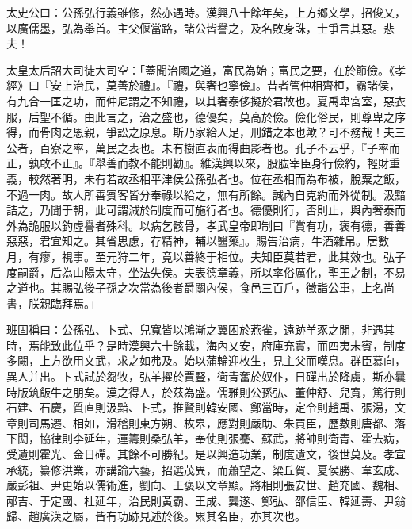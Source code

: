 \begin{pinyinscope}
太史公曰：公孫弘行義雖修，然亦遇時。漢興八十餘年矣，上方鄉文學，招俊乂，以廣儒墨，弘為舉首。主父偃當路，諸公皆譽之，及名敗身誅，士爭言其惡。悲夫！

太皇太后詔大司徒大司空：「蓋聞治國之道，富民為始；富民之要，在於節儉。《孝經》曰『安上治民，莫善於禮』。『禮，與奢也寧儉』。昔者管仲相齊桓，霸諸侯，有九合一匡之功，而仲尼謂之不知禮，以其奢泰侈擬於君故也。夏禹卑宮室，惡衣服，后聖不循。由此言之，治之盛也，德優矣，莫高於儉。儉化俗民，則尊卑之序得，而骨肉之恩親，爭訟之原息。斯乃家給人足，刑錯之本也歟？可不務哉！夫三公者，百寮之率，萬民之表也。未有樹直表而得曲影者也。孔子不云乎，『子率而正，孰敢不正』。『舉善而教不能則勸』。維漢興以來，股肱宰臣身行儉約，輕財重義，較然著明，未有若故丞相平津侯公孫弘者也。位在丞相而為布被，脫粟之飯，不過一肉。故人所善賓客皆分奉祿以給之，無有所餘。誠內自克約而外從制。汲黯詰之，乃聞于朝，此可謂減於制度而可施行者也。德優則行，否則止，與內奢泰而外為詭服以釣虛譽者殊科。以病乞骸骨，孝武皇帝即制曰『賞有功，褒有德，善善惡惡，君宜知之。其省思慮，存精神，輔以醫藥』。賜告治病，牛酒雜帛。居數月，有瘳，視事。至元狩二年，竟以善終于相位。夫知臣莫若君，此其效也。弘子度嗣爵，后為山陽太守，坐法失侯。夫表德章義，所以率俗厲化，聖王之制，不易之道也。其賜弘後子孫之次當為後者爵關內侯，食邑三百戶，徵詣公車，上名尚書，朕親臨拜焉。」

班固稱曰：公孫弘、卜式、兒寬皆以鴻漸之翼困於燕雀，遠跡羊豕之閒，非遇其時，焉能致此位乎？是時漢興六十餘載，海內乂安，府庫充實，而四夷未賓，制度多闕，上方欲用文武，求之如弗及。始以蒲輪迎枚生，見主父而嘆息。群臣慕向，異人并出。卜式試於芻牧，弘羊擢於賈豎，衛青奮於奴仆，日磾出於降虜，斯亦曩時版筑飯牛之朋矣。漢之得人，於茲為盛。儒雅則公孫弘、董仲舒、兒寬，篤行則石建、石慶，質直則汲黯、卜式，推賢則韓安國、鄭當時，定令則趙禹、張湯，文章則司馬遷、相如，滑稽則東方朔、枚皋，應對則嚴助、朱買臣，歷數則唐都、落下閎，協律則李延年，運籌則桑弘羊，奉使則張騫、蘇武，將帥則衛青、霍去病，受遺則霍光、金日磾。其餘不可勝紀。是以興造功業，制度遺文，後世莫及。孝宣承統，纂修洪業，亦講論六藝，招選茂異，而蕭望之、梁丘賀、夏侯勝、韋玄成、嚴彭祖、尹更始以儒術進，劉向、王褒以文章顯。將相則張安世、趙充國、魏相、邴吉、于定國、杜延年，治民則黃霸、王成、龔遂、鄭弘、邵信臣、韓延壽、尹翁歸、趙廣漢之屬，皆有功跡見述於後。累其名臣，亦其次也。


\end{pinyinscope}